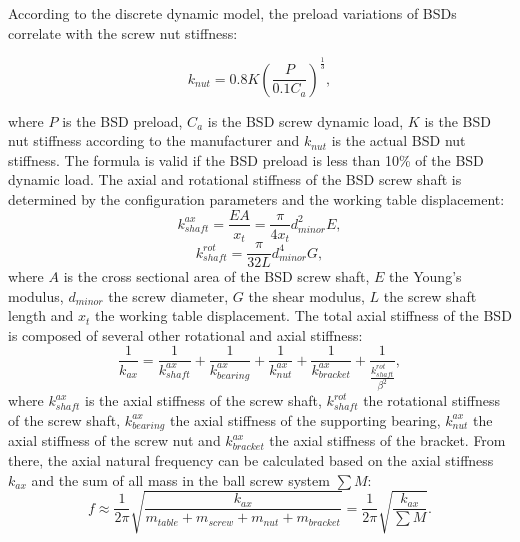 According to the discrete dynamic model, the preload variations of BSDs correlate with the screw nut stiffness:

\begin{equation}
    k_{nut}=0.8K(\frac{P}{0.1C_{a}})^{\frac{1}{3}},
\end{equation}

where $P$ is the BSD preload, $C_{a}$ is the BSD screw dynamic load, $K$ is the BSD nut stiffness according to the manufacturer and $k_{nut}$ is the actual BSD nut stiffness. The formula is valid if the BSD preload is less than 10\% of the BSD dynamic load. The axial and rotational stiffness of the BSD screw shaft is determined by the configuration parameters and the working table displacement:
\begin{equation}
    k_{shaft}^{ax}=\frac{EA}{x_{t}}=\frac{\pi}{4x_{t}}d_{minor}^{2}E,
\end{equation}
\begin{equation}
    k_{shaft}^{rot}=\frac{\pi}{32L}d_{minor}^{4}G,
\end{equation}
 where $A$ is the cross sectional area of the BSD screw shaft, $E$ the Young’s modulus, $d_{minor}$ the screw diameter, $G$ the shear modulus, $L$ the screw shaft length and $x_{t}$ the working table displacement. The total axial stiffness of the BSD is composed of several other rotational and axial stiffness:
 \begin{equation}
    \frac{1}{k_{ax}}=\frac{1}{k_{shaft}^{ax}}+\frac{1}{k_{bearing}^{ax}}+\frac{1}{k_{nut}^{ax}}+\frac{1}{k_{bracket}^{ax}}+\frac{1}{\frac{k_{shaft}^{rot}}{\beta^{2}}},
\end{equation}
where $k_{shaft}^{ax}$ is the axial stiffness of the screw shaft,  $k_{shaft}^{rot}$ the rotational stiffness of the screw shaft, $k_{bearing}^{ax}$ the axial stiffness of the supporting bearing, $k_{nut}^{ax}$ the axial stiffness of the screw nut and $k_{bracket}^{ax}$ the axial stiffness of the bracket. From there, the axial natural frequency can be calculated based on the axial stiffness $k_{ax}$ and the sum of all mass in the ball screw system $\sum M$:
\begin{equation}
    f\approx\frac{1}{2\pi}\sqrt{\frac{k_{ax}}{m_{table}+m_{screw}+m_{nut}+m_{bracket}}}=\frac{1}{2\pi}\sqrt{\frac{k_{ax}}{\sum M}}.
\end{equation}

